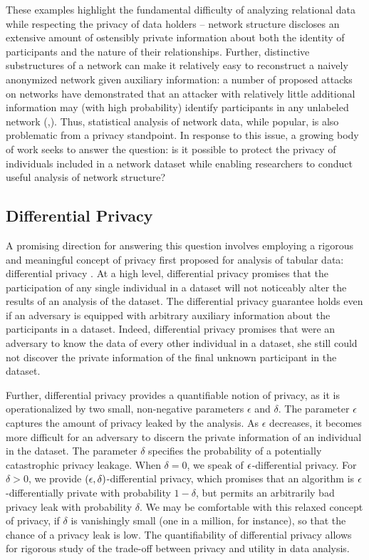 These examples highlight the fundamental difficulty of analyzing relational data while respecting the privacy of data holders -- network structure discloses an extensive amount of ostensibly private information about both the identity of participants and the nature of their relationships. Further, distinctive substructures of a network can make it relatively easy to reconstruct a naively anonymized network given auxiliary information: a number of proposed attacks on networks have demonstrated that an attacker with relatively little additional information may (with high probability) identify participants in any unlabeled network (\cite{BDK11},\cite{NS09}). Thus, statistical analysis of network data, while popular, is also problematic from a privacy standpoint. In response to this issue, a growing body of work seeks to answer the question: is it possible to protect the privacy of individuals included in a network dataset while enabling researchers to conduct useful analysis of network structure?

\subsection{Differential Privacy}

A promising direction for answering this question involves employing a rigorous and meaningful concept of privacy first proposed for analysis of tabular data: differential privacy \cite{DMNS06}. At a high level, differential privacy promises that the participation of any single individual in a dataset will not noticeably alter the results of an analysis of the dataset. The differential privacy guarantee  holds even if an adversary is equipped with arbitrary auxiliary information about the participants in a dataset. Indeed, differential privacy promises that were an adversary to know the data of every other individual in a dataset, she still could not discover the private information of the final unknown participant in the dataset. 

Further, differential privacy provides a quantifiable notion of privacy, as it is operationalized by two small, non-negative parameters $\epsilon$ and $\delta$. The parameter $\epsilon$ captures the amount of privacy leaked by the analysis. As $\epsilon$ decreases, it becomes more difficult for an adversary to discern the private information of an individual in the dataset. The parameter $\delta$ specifies the probability of a potentially catastrophic privacy leakage. When $\delta = 0$, we speak of $\epsilon$-differential privacy. For $\delta > 0$, we provide $(\epsilon, \delta)$-differential privacy, which promises that an algorithm is $\epsilon$-differentially private with probability $1-\delta$, but permits an arbitrarily bad privacy leak with probability $\delta$. We may be comfortable with this relaxed concept of privacy, if $\delta$ is vanishingly small (one in a million, for instance), so that the chance of a privacy leak is low. The quantifiability of differential privacy allows for rigorous study of the trade-off between privacy and utility in data analysis.

